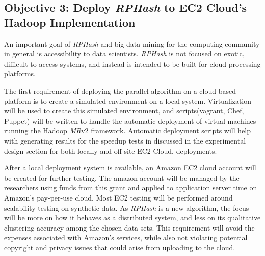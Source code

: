 \documentclass[a4paper,10pt]{article}
\begin{document}
\subsection{Objective 3: Deploy \emph{RPHash} to EC2 Cloud's Hadoop
Implementation} An important goal of \emph{RPHash} and big data mining for
the computing community in general is accessibility to data scientists.
\emph{RPHash} is not focused on exotic, difficult to access systems, and
instead is intended to be built for cloud processing platforms.

The first requirement of deploying the parallel algorithm on a cloud
based platform is to create a simulated environment on a local system.
Virtualization will be used to create this simulated environment, and
scripts(vagrant, Chef, Puppet) will be written to handle the automatic
deployment of virtual machines running the Hadoop \emph{MR}v2 framework.
Automatic deployment scripts will help with generating results for the speedup
tests in discussed in the experimental design section for both locally and
off-site EC2 Cloud, deployments.

After a local deployment system is available, an Amazon EC2 cloud account will
be created for further testing.  The amazon account will be managed by the
researchers using funds from this grant and applied to application server
time on Amazon's pay-per-use cloud.  Most EC2 testing will be performed
around scalability testing on synthetic data.  As \emph{RPHash} is a new
algorithm, the focus will be more on how it behaves as a distributed system,
and less on its qualitative clustering accuracy among the chosen data sets.
This requirement will avoid the expenses associated with Amazon's services,
while also not violating potential copyright and privacy issues that could
arise from uploading to the cloud.
\end{document}
